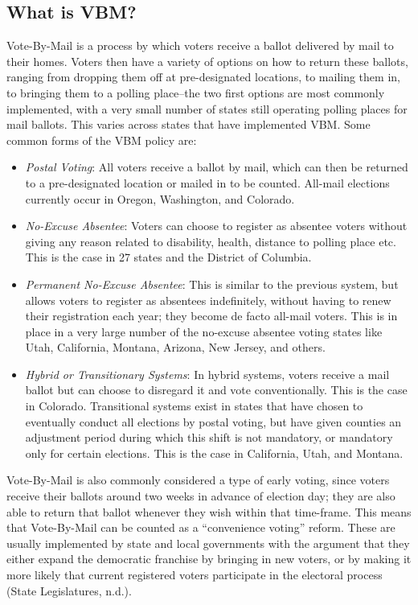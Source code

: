 \documentclass[12pt,twoside]{reedthesis}
\begin{document}
  \subsection{What is VBM?}\label{what-is-vbm}
  
  Vote-By-Mail is a process by which voters receive a ballot delivered by
  mail to their homes. Voters then have a variety of options on how to
  return these ballots, ranging from dropping them off at pre-designated
  locations, to mailing them in, to bringing them to a polling place--the
  two first options are most commonly implemented, with a very small
  number of states still operating polling places for mail ballots. This
  varies across states that have implemented VBM. Some common forms of the
  VBM policy are:
  
  \begin{itemize}
  \item
    \emph{Postal Voting}: All voters receive a ballot by mail, which can
    then be returned to a pre-designated location or mailed in to be
    counted. All-mail elections currently occur in Oregon, Washington, and
    Colorado.
  \item
    \emph{No-Excuse Absentee}: Voters can choose to register as absentee
    voters without giving any reason related to disability, health,
    distance to polling place etc. This is the case in 27 states and the
    District of Columbia.
  \item
    \emph{Permanent No-Excuse Absentee}: This is similar to the previous
    system, but allows voters to register as absentees indefinitely,
    without having to renew their registration each year; they become de
    facto all-mail voters. This is in place in a very large number of the
    no-excuse absentee voting states like Utah, California, Montana,
    Arizona, New Jersey, and others.
  \item
    \emph{Hybrid or Transitionary Systems}: In hybrid systems, voters
    receive a mail ballot but can choose to disregard it and vote
    conventionally. This is the case in Colorado. Transitional systems
    exist in states that have chosen to eventually conduct all elections
    by postal voting, but have given counties an adjustment period during
    which this shift is not mandatory, or mandatory only for certain
    elections. This is the case in California, Utah, and Montana.
  \end{itemize}
  
  Vote-By-Mail is also commonly considered a type of early voting, since
  voters receive their ballots around two weeks in advance of election
  day; they are also able to return that ballot whenever they wish within
  that time-frame. This means that Vote-By-Mail can be counted as a
  ``convenience voting'' reform. These are usually implemented by state
  and local governments with the argument that they either expand the
  democratic franchise by bringing in new voters, or by making it more
  likely that current registered voters participate in the electoral
  process (State Legislatures, n.d.).
  
\end{document}

